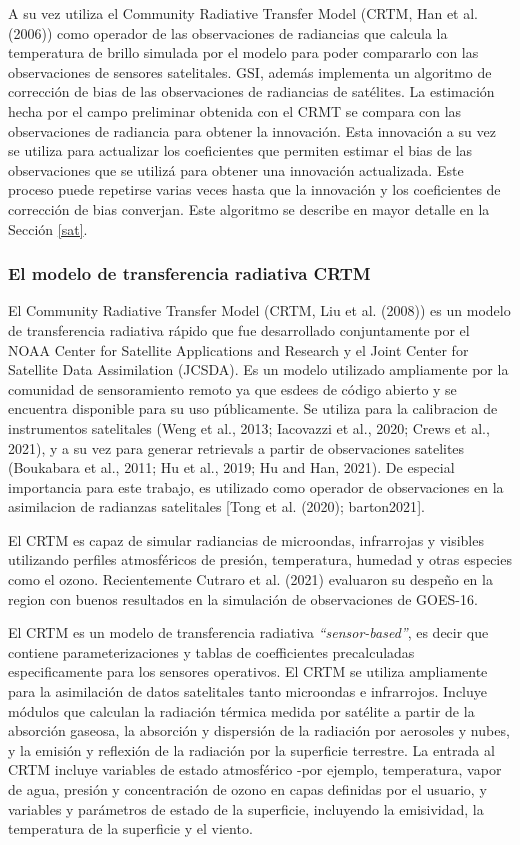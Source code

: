 \documentclass[12pt,oneside]{reedthesis}
\begin{document}
A su vez utiliza el Community Radiative Transfer Model (CRTM, Han et al. (2006)) como operador de las observaciones de radiancias que calcula la temperatura de brillo simulada por el modelo para poder compararlo con las observaciones de sensores satelitales.
GSI, además implementa un algoritmo de corrección de bias de las observaciones de radiancias de satélites.
La estimación hecha por el campo preliminar obtenida con el CRMT se compara con las observaciones de radiancia para obtener la innovación.
Esta innovación a su vez se utiliza para actualizar los coeficientes que permiten estimar el bias de las observaciones que se utilizá para obtener una innovación actualizada. Este proceso puede repetirse varias veces hasta que la innovación y los coeficientes de corrección de bias converjan.
Este algoritmo se describe en mayor detalle en la Sección \ref{sat}.

\hypertarget{el-modelo-de-transferencia-radiativa-crtm}{%
\subsubsection{El modelo de transferencia radiativa CRTM}\label{el-modelo-de-transferencia-radiativa-crtm}}

El Community Radiative Transfer Model (CRTM, Liu et al. (2008)) es un modelo de transferencia radiativa rápido que fue desarrollado conjuntamente por el NOAA Center for Satellite Applications and Research y el Joint Center for Satellite Data Assimilation (JCSDA). Es un modelo utilizado ampliamente por la comunidad de sensoramiento remoto ya que esdees de código abierto y se encuentra disponible para su uso públicamente. Se utiliza para la calibracion de instrumentos satelitales (Weng et al., 2013; Iacovazzi et al., 2020; Crews et al., 2021), y a su vez para generar retrievals a partir de observaciones satelites (Boukabara et al., 2011; Hu et al., 2019; Hu and Han, 2021). De especial importancia para este trabajo, es utilizado como operador de observaciones en la asimilacion de radianzas satelitales {[}Tong et al. (2020); barton2021{]}.

El CRTM es capaz de simular radiancias de microondas, infrarrojas y visibles utilizando perfiles atmosféricos de presión, temperatura, humedad y otras especies como el ozono. Recientemente Cutraro et al. (2021) evaluaron su despeño en la region con buenos resultados en la simulación de observaciones de GOES-16.

El CRTM es un modelo de transferencia radiativa \emph{``sensor-based''}, es decir que contiene parameterizaciones y tablas de coefficientes precalculadas especificamente para los sensores operativos. El CRTM se utiliza ampliamente para la asimilación de datos satelitales tanto microondas e infrarrojos. Incluye módulos que calculan la radiación térmica medida por satélite a partir de la absorción gaseosa, la absorción y dispersión de la radiación por aerosoles y nubes, y la emisión y reflexión de la radiación por la superficie terrestre. La entrada al CRTM incluye variables de estado atmosférico -por ejemplo, temperatura, vapor de agua, presión y concentración de ozono en capas definidas por el usuario, y variables y parámetros de estado de la superficie, incluyendo la emisividad, la temperatura de la superficie y el viento.
\end{document}
